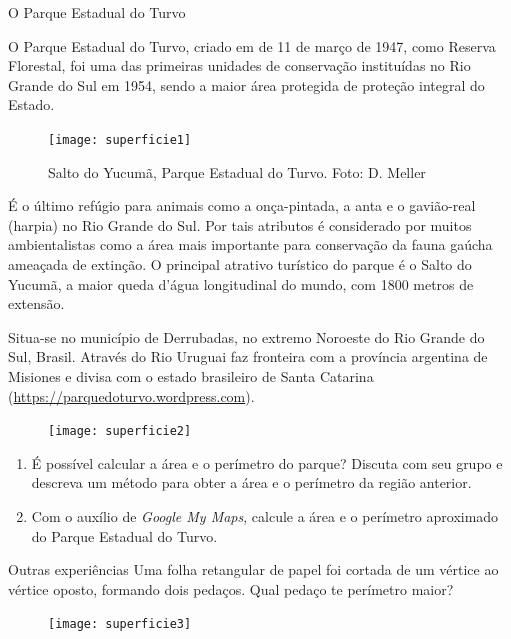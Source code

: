\begin{task}{O Parque Estadual do Turvo}

\begin{multicols}{2}

O Parque Estadual do Turvo, criado em de 11 de março de 1947, como Reserva Florestal, foi uma das primeiras unidades de conservação instituídas no Rio Grande do Sul em 1954, sendo a maior área protegida de proteção integral do Estado.

\begin{figure}[H]
\centering

\texttt{[image: superficie1]}

\caption{Salto do Yucumã, Parque Estadual do Turvo. Foto: D. Meller}
\end{figure}

\end{multicols}

É o último refúgio para animais como a onça-pintada, a anta e o gavião-real (harpia) no Rio Grande do Sul. Por tais atributos é considerado por muitos ambientalistas como a área mais importante para conservação da fauna gaúcha ameaçada de extinção. O principal atrativo turístico do parque é o Salto do Yucumã, a maior queda d’água longitudinal do mundo, com 1800 metros de extensão.

Situa-se no município de Derrubadas, no extremo Noroeste do Rio Grande do Sul, Brasil. Através do Rio Uruguai faz fronteira com a província argentina de Misiones e divisa com o estado brasileiro de Santa Catarina (\url{https://parquedoturvo.wordpress.com}).

\begin{figure}[H]
\centering

\texttt{[image: superficie2]}

\end{figure}

\begin{enumerate}
  \item É possível calcular a área e o perímetro do parque? Discuta com seu grupo e descreva um método para obter a área e o perímetro da região anterior.
  \item Com o auxílio de \textit{Google My Maps}, calcule a área e o perímetro aproximado do Parque Estadual do Turvo.
\end{enumerate}
\end{task}

\begin{task}{Outras experiências}
Uma folha retangular de papel foi cortada de um vértice ao vértice oposto, formando dois pedaços. Qual pedaço te perímetro maior?
\begin{figure}[H]
\centering

\texttt{[image: superficie3]}

\end{figure}
\end{task}

